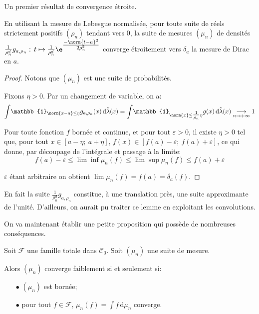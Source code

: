 Un premier résultat de convergence étroite.

\begin{prop}
En utilisant la mesure de Lebesgue normalisée, pour toute suite de réels strictement positifs $(\rho_n)$ tendant vers $0$, la suite de mesures $(\mu_n)$ de densités $\frac{1}{\rho_n^d} g_{a,\rho_n}: \, t \mapsto \frac{1}{\rho_n^d} \e^{\tfrac{-\norm{t-a}^2}{2 \rho_n^2}}$ converge étroitement vers $\delta_a$ la mesure de Dirac en $a$.
\end{prop}

\begin{proof}
Notons que $(\mu_n)$ est une suite de probabilités.

\medskip
Fixons $\eta>0$. Par un changement de variable, on a:
\[
\displaystyle{\int} \mathbb{1}_{\norm{x-a} \leq \eta} g_{a,\rho_n}(x) \, \mathrm d \tilde{\lambda}(x) = \displaystyle{\int} \mathbb{1}_{\norm{x} \leq \tfrac{1}{\rho_n} \eta} g(x) \, \mathrm d \tilde{\lambda}(x) \underset{n \to +\infty}{\longrightarrow}  1
\]

Pour toute fonction $f$ bornée et continue, et pour tout $\varepsilon>0$, il existe $\eta>0$ tel que, pour tout $x \in \left [ a-\eta;~a+\eta \right ]$, $f(x) \in \left [ f(a)-\varepsilon;~f(a) + \varepsilon\right ]$, ce qui donne, par découpage de l'intégrale et passage à la limite:
\[
f(a) - \varepsilon \leq \lim \inf  \mu_n\left ( f \right ) \leq \lim \sup \mu_n\left ( f \right ) \leq f(a) + \varepsilon
\]

$\varepsilon$ étant arbitraire on obtient $\lim \mu_n(f) = f(a) = \delta_a(f)$.
\end{proof}

\begin{cerveau}
En fait la suite $\frac{1}{\rho_n^d} g_{a,\rho_n}$ constitue, à une translation près, une suite approximante de l'unité. D'ailleurs, on aurait pu traiter ce lemme en exploitant les convolutions.
\end{cerveau}

On va maintenant établir une petite proposition qui possède de nombreuses conséquences.

\begin{prop}
Soit $\mathcal{F}$ une famille totale dans $\mathcal{C}_0$. Soit $(\mu_n)$ une suite de mesure.

\medskip
Alors $(\mu_n)$ converge faiblement si et seulement si:
\begin{itemize}
\item[$\bullet$] 
$(\mu_n)$ est bornée;
\item[$\bullet$] 
pour tout $f \in \mathcal{F}$, $\mu_n(f)  = \displaystyle{\int} f  \, \mathrm d \mu_n$ converge.
\end{itemize}
\end{prop}

